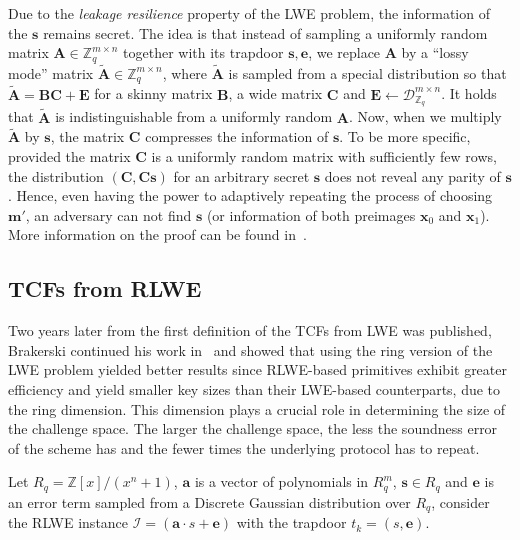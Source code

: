 \documentclass[cryptography,review,submit,pdftex,moreauthors,amsmath,amssymb,aps,strict]{Definitions/mdpi}
\begin{document}
Due to the \textit{leakage resilience} property of the LWE problem, the information of the $\mathbf{s}$ remains secret. The idea is that instead of sampling a uniformly random matrix $\mathbf{A}\in\mathbb{Z}^{m\times n}_q$ together with its trapdoor $\mathbf{s},\mathbf{e}$, we replace $\mathbf{A}$ by a ``lossy mode'' matrix $\tilde{\mathbf{A}}\in\mathbb{Z}^{m\times n}_q$, where $\tilde{\mathbf{A}}$ is sampled from a special distribution so that $\tilde{\mathbf{A}}=\mathbf{B}\mathbf{C}+\mathbf{E}$ for a skinny matrix $\mathbf{B}$, a wide matrix $\mathbf{C}$ and $\mathbf{E}\gets\mathcal{D}_{\mathbb{Z}_q}^{m\times n}$. It holds that $\tilde{\mathbf{A}}$ is indistinguishable from a uniformly random $\mathbf{A}$. Now, when we multiply $\tilde{\mathbf{A}}$ by $\mathbf{s}$, the matrix $\mathbf{C}$ compresses the information of $\mathbf{s}$. To be more specific, provided the matrix $\mathbf{C}$ is a uniformly random matrix with sufficiently few rows, the distribution $(\mathbf{C},\mathbf{C}\mathbf{s})$ for an arbitrary secret $\mathbf{s}$ does not reveal any parity of $\mathbf{s}$.
Hence, even having the power to adaptively repeating the process of choosing $\mathbf{m}'$, an adversary can not find $\mathbf{s}$ (or information of both preimages $\mathbf{x}_0$ and $\mathbf{x}_1$).
More information on the proof can be found in~\cite{Brakerski18_Interactiveproofofquantumness}.


\subsection{TCFs from RLWE}
Two years later from the first definition of the TCFs from LWE was published, Brakerski continued his work in~\cite{BrakerskiProofofQuantumness} and showed that using the ring version of the LWE problem yielded better results since RLWE-based primitives exhibit greater efficiency and yield smaller key sizes than their LWE-based counterparts, due to the ring dimension. This dimension plays a crucial role in determining the size of the challenge space. The larger the challenge space, the less the soundness error of the scheme has and the fewer times the underlying protocol has to repeat. 

Let $R_q=\mathbb{Z}[x]/(x^n+1)$, $\mathbf{a}$ is a vector of polynomials in $R_q^m$, $\mathbf{s}\in R_q$ and $\mathbf{e}$ is an error term sampled from a Discrete Gaussian distribution over $R_q$, consider the RLWE instance $\mathcal{I}=(\mathbf{a}\cdot s +\mathbf{e})$ with the trapdoor $t_k=(s,\mathbf{e})$.
\end{document}
